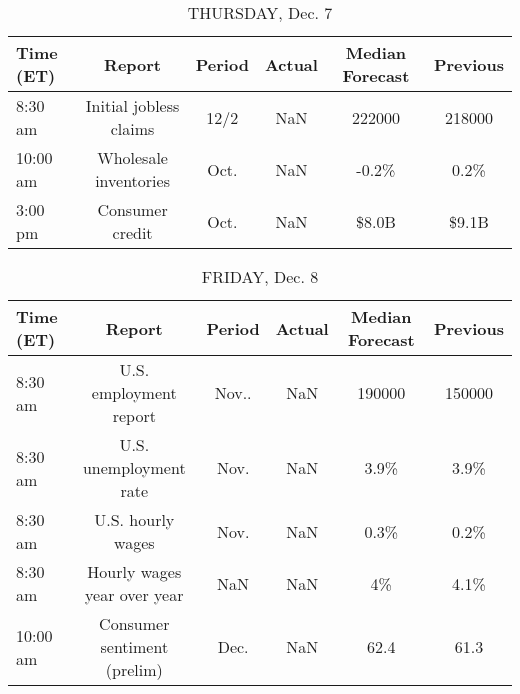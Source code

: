 \documentclass{article}%
\begin{document}
%


\begin{table}[htbp]%
\caption{THURSDAY, Dec. 7}%
\centering%
\begin{adjustbox}{width=1\textwidth}%
\begin{tabular}{lccccc}
\toprule
Time (ET) &                 Report & Period & Actual & Median Forecast & Previous \\
\midrule
  8:30 am & Initial jobless claims &   12/2 &    NaN &          222000 &   218000 \\
 10:00 am &  Wholesale inventories &   Oct. &    NaN &           -0.2\% &     0.2\% \\
  3:00 pm &        Consumer credit &   Oct. &    NaN &           \$8.0B &    \$9.1B \\
\bottomrule
\end{tabular}
%
\end{adjustbox}%
\end{table}

%


\begin{table}[htbp]%
\caption{FRIDAY, Dec. 8}%
\centering%
\begin{adjustbox}{width=1\textwidth}%
\begin{tabular}{lccccc}
\toprule
Time (ET) &                      Report & Period & Actual & Median Forecast & Previous \\
\midrule
  8:30 am &      U.S. employment report &  Nov.. &    NaN &          190000 &   150000 \\
  8:30 am &      U.S. unemployment rate &   Nov. &    NaN &            3.9\% &     3.9\% \\
  8:30 am &           U.S. hourly wages &   Nov. &    NaN &            0.3\% &     0.2\% \\
  8:30 am & Hourly wages year over year &    NaN &    NaN &              4\% &     4.1\% \\
 10:00 am & Consumer sentiment (prelim) &   Dec. &    NaN &            62.4 &     61.3 \\
\bottomrule
\end{tabular}
%
\end{adjustbox}%
\end{table}
\end{document}
